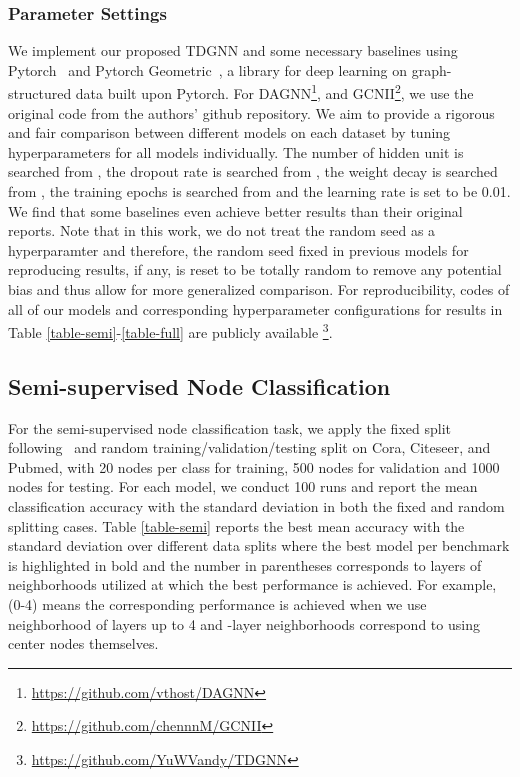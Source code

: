 \subsubsection{Parameter Settings}
We implement our proposed TDGNN and some necessary baselines using Pytorch~\cite{pytorch} and Pytorch Geometric~\cite{paszke2019pytorch}, a library for deep learning on graph-structured data built upon Pytorch. For DAGNN\footnote{\url{https://github.com/vthost/DAGNN}}, and GCNII\footnote{\url{https://github.com/chennnM/GCNII}}, we use the original code from the authors' github repository. We aim to provide a rigorous and fair comparison between different models on each dataset by tuning hyperparameters for all models individually. The number of hidden unit is searched from , the dropout rate is searched from , the weight decay is searched from , the training epochs is searched from  and the learning rate is set to be 0.01. We find that some baselines even achieve better results than their original reports. Note that in this work, we do not treat the random seed as a hyperparamter and therefore, the random seed fixed in previous models for reproducing results, if any, is reset to be totally random to remove any potential bias and thus allow for more generalized comparison. For reproducibility, codes of all of our models and corresponding hyperparameter configurations for results in Table \ref{table-semi}-\ref{table-full} are publicly available \footnote{\url{https://github.com/YuWVandy/TDGNN}\label{github}}. 

\subsection{Semi-supervised Node Classification}
For the semi-supervised node classification task, we apply the fixed split following~\cite{yang2016revisiting} and random training/validation/testing split on Cora, Citeseer, and Pubmed, with 20 nodes per class for training, 500 nodes for validation and 1000 nodes for testing. For each model, we conduct 100 runs and report the mean classification accuracy with the standard deviation in both the fixed and random splitting cases. Table \ref{table-semi} reports the best mean accuracy with the standard deviation over different data splits where the best model per benchmark is highlighted in bold and the number in parentheses corresponds to layers of neighborhoods utilized at which the best performance is achieved. For example, (0-4) means the corresponding performance is achieved when we use neighborhood of layers up to 4 and -layer neighborhoods correspond to using center nodes themselves.



